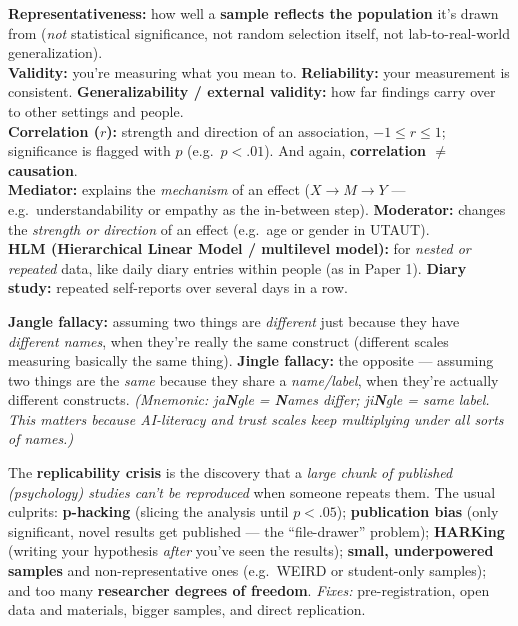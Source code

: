 \documentclass[11pt, oneside]{book}
\begin{document}
\begin{defbox}[title={Key measurement \& analysis terms}]
\textbf{Representativeness:} how well a \textbf{sample reflects the population}
it's drawn from (\emph{not} statistical significance, not random selection
itself, not lab-to-real-world generalization).\\
\textbf{Validity:} you're measuring what you mean to. \textbf{Reliability:}
your measurement is consistent. \textbf{Generalizability / external validity:}
how far findings carry over to other settings and people.\\
\textbf{Correlation ($r$):} strength and direction of an association,
$-1 \le r \le 1$; significance is flagged with $p$ (e.g.\ $p<.01$). And again,
\textbf{correlation $\ne$ causation}.\\
\textbf{Mediator:} explains the \emph{mechanism} of an effect ($X \to M \to Y$
— e.g.\ understandability or empathy as the in-between step).
\textbf{Moderator:} changes the \emph{strength or direction} of an effect
(e.g.\ age or gender in UTAUT).\\
\textbf{HLM (Hierarchical Linear Model / multilevel model):} for \emph{nested
or repeated} data, like daily diary entries within people (as in Paper 1).
\textbf{Diary study:} repeated self-reports over several days in a row.
\end{defbox}

\begin{notebox}[title={Construct pitfalls: jangle vs.\ jingle fallacy}]
\textbf{Jangle fallacy:} assuming two things are \emph{different} just because
they have \emph{different names}, when they're really the same construct
(different scales measuring basically the same thing). \textbf{Jingle
fallacy:} the opposite — assuming two things are the \emph{same} because they
share a \emph{name/label}, when they're actually different constructs.
\emph{(Mnemonic: ja\textbf{N}gle = \textbf{N}ames differ; ji\textbf{N}gle =
same label. This matters because AI-literacy and trust scales keep multiplying
under all sorts of names.)}
\end{notebox}

\begin{notebox}[title={The replicability (replication) crisis}]
The \textbf{replicability crisis} is the discovery that a \emph{large chunk of
published (psychology) studies can't be reproduced} when someone repeats them.
The usual culprits: \textbf{p-hacking} (slicing the analysis until $p<.05$);
\textbf{publication bias} (only significant, novel results get published — the
``file-drawer'' problem); \textbf{HARKing} (writing your hypothesis
\emph{after} you've seen the results); \textbf{small, underpowered samples}
and non-representative ones (e.g.\ WEIRD or student-only samples); and too many
\textbf{researcher degrees of freedom}. \emph{Fixes:} pre-registration, open
data and materials, bigger samples, and direct replication.
\end{notebox}
\end{document}
